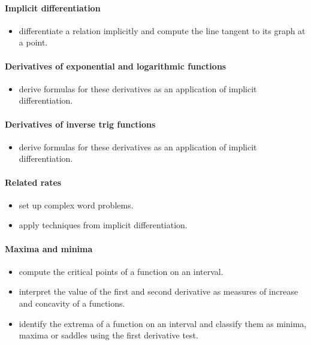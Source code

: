 \documentclass{amsart}
\begin{document}
\paragraph*{Implicit differentiation}
\begin{itemize}
\item differentiate a relation implicitly and compute the line tangent
  to its graph at a point. 
\end{itemize}

\paragraph*{Derivatives of exponential and logarithmic functions}
\begin{itemize}
\item derive formulas for these derivatives as an application of implicit differentiation. 
\end{itemize}

\paragraph*{Derivatives of inverse trig functions}
\begin{itemize}
\item derive formulas for these derivatives as an application of implicit differentiation. 
\end{itemize}


\paragraph*{Related rates}
\begin{itemize}
\item set up complex word problems.
\item apply techniques from implicit differentiation.
\end{itemize}


\paragraph*{Maxima and minima}
\begin{itemize}
\item compute the critical points of a function on an interval.
\item interpret the value of the first and second derivative as
  measures of increase and concavity of a functions.
\item identify the extrema of a function on an interval and classify them as
 minima, maxima or saddles using the first derivative test.
\end{itemize}
\end{document}
